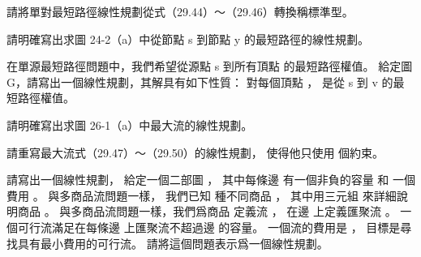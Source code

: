 \startsection[
  title={Formulating problems as linear programs},
  reference={section:formulate_as_linear},
]

\startEXERCISE
請將單對最短路徑線性規劃從式（29.44）～（29.46）轉換稱標準型。
\stopEXERCISE

\startANSWER
{}
\stopANSWER

\startEXERCISE
請明確寫出求圖 24-2（a）中從節點 s 到節點 y 的最短路徑的線性規劃。
\stopEXERCISE

\startANSWER
{}
\stopANSWER

\startEXERCISE
在單源最短路徑問題中，我們希望從源點 s 到所有頂點  的最短路徑權值。
給定圖 G，請寫出一個線性規劃，其解具有如下性質：
對每個頂點 ，  是從 s 到 v 的最短路徑權值。
\stopEXERCISE

\startANSWER
{}
\stopANSWER

\startEXERCISE
請明確寫出求圖 26-1（a）中最大流的線性規劃。
\stopEXERCISE

\startANSWER
{}
\stopANSWER

\startEXERCISE
請重寫最大流式（29.47）～（29.50）的線性規劃，
使得他只使用  個約束。
\stopEXERCISE

\startANSWER
{}
\stopANSWER

\startEXERCISE
請寫出一個線性規劃，
給定一個二部圖 ，
其中每條邊  有一個非負的容量  和
一個費用 。
與多商品流問題一樣，
我們已知  種不同商品 ，
其中用三元組  來詳細說明商品 。
與多商品流問題一樣，我們爲商品  定義流 ，
在邊  上定義匯聚流 。
一個可行流滿足在每條邊  上匯聚流不超過邊  的容量。
一個流的費用是 ，
目標是尋找具有最小費用的可行流。
請將這個問題表示爲一個線性規劃。
\stopEXERCISE

\startANSWER
{}
\stopANSWER

\stopsection
